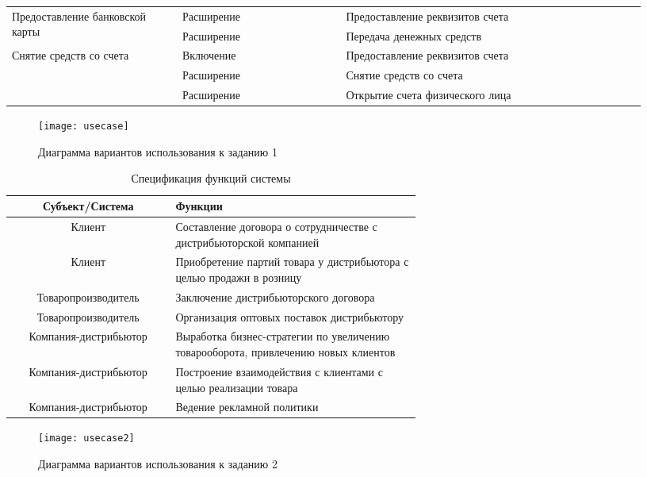 \documentclass[a4paper,14pt]{extarticle}
\begin{document}
\begin{longtable}{|m{0.25\linewidth}|m{0.24\linewidth}|m{0.44\linewidth}|}
	\multirow{2}{\linewidth}{\small Предоставление банковской карты} & Расширение & Предоставление реквизитов счета \\ \cline{2-3}
	& Расширение & Передача денежных средств  \\ \hline
	Снятие средств со счета & Включение & Предоставление реквизитов счета \\ \hline \newpage
	\multirow{2}{\linewidth}{Закрытие счета} & Расширение & Снятие средств со счета \\ \cline{2-3}
	& Расширение & Открытие счета физического лица \\ \hline	
\end{longtable}

\begin{figure}[h]
	\centering
	\texttt{[image: usecase]}
	\caption{Диаграмма вариантов использования к заданию 1}
	\label{img:usecase}
\end{figure}

\begin{table}
	\caption{Спецификация функций системы}
	\begin{tabular}{|c|m{0.6\linewidth}|}
		\hline
		\textbf{Субъект/Система} & \textbf{Функции} \\ \hline
		Клиент & Составление договора о сотрудничестве с дистрибьюторской компанией \\  \hline
		Клиент & Приобретение партий товара у дистрибьютора с целью продажи в розницу \\ \hline
		Товаропроизводитель & Заключение дистрибьюторского договора \\ \hline
		Товаропроизводитель & Организация оптовых поставок дистрибьютору \\ \hline
		Компания-дистрибьютор & Выработка бизнес-стратегии по увеличению товарооборота, привлечению новых клиентов \\ \hline
		Компания-дистрибьютор & Построение взаимодействия с клиентами с целью реализации товара \\ \hline
		Компания-дистрибьютор & Ведение рекламной политики \\ \hline			
	\end{tabular}
	
	\label{tab:func_spec}
\end{table}
\begin{figure}[tpb]
	\centering
	\vspace{2ex}
	\texttt{[image: usecase2]}
	\caption{Диаграмма вариантов использования к заданию 2}
	\label{img:usecase2}
\end{figure}
\end{document}
